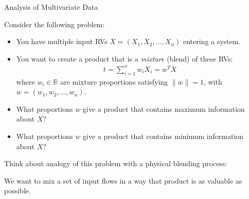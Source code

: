 \documentclass[9pt]{beamer}
\begin{document}
%
\begin{frame}{Analysis of Multivariate Data}

Consider the following problem:
\begin{itemize}
\item You have multiple input RVs $X=(X_1,X_2,...,X_n)$ entering a system.
 
\item You want to create a product that is a {\em mixture} (blend) of these RVs:
\begin{align*}
t=\sum_{i=1}^nw_iX_i=w^TX
\end{align*}
where $w_i\in \mathbb{R}$ are  mixture proportions satisfying $\|w\|=1$, with $w=(w_1, w_2,...,w_n)$. 

\item What proportions $w$ give a product that contains maximum information about $X$?
\item What proportions $w$ give a product that contains minimum information about $X$?

\end{itemize}

Think about analogy of this problem with a physical blending process: 
\begin{block}{}
We want to mix a set of input flows in a way that product is as valuable as possible.  
\end{block}

\end{frame}
\end{document}
